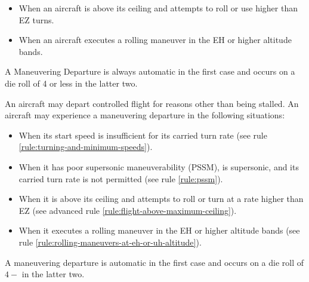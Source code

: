 \begin{advancedrules}
{\begin{itemize}
    \item When an aircraft is above its ceiling and attempts to roll or use higher than EZ turns.

    \item When an aircraft executes a rolling maneuver in the EH or higher altitude bands.

\end{itemize}

A Maneuvering Departure is always automatic in the first case and occurs on a die roll of 4 or less in the latter two.  
}{
An aircraft may depart controlled flight for reasons other than being stalled. An aircraft may experience a maneuvering departure in the following situations:

\begin{itemize}
    \item When its start speed is insufficient for its carried turn rate (see rule \ref{rule:turning-and-minimum-speeds}).
    
    \item When it has poor supersonic maneuverability (PSSM), is supersonic, and its carried turn rate is not permitted (see rule \ref{rule:pssm}).

    \item When it is above its ceiling and attempts to roll or turn at a rate higher than EZ (see advanced rule \ref{rule:flight-above-maximum-ceiling}).

    \item When it executes a rolling maneuver in the EH or higher altitude bands (see rule \ref{rule:rolling-maneuvers-at-eh-or-uh-altitude}).

\end{itemize}

A maneuvering departure is automatic in the first case and occurs on a die roll of $4-$ in the latter two. 
}

\end{advancedrules}
